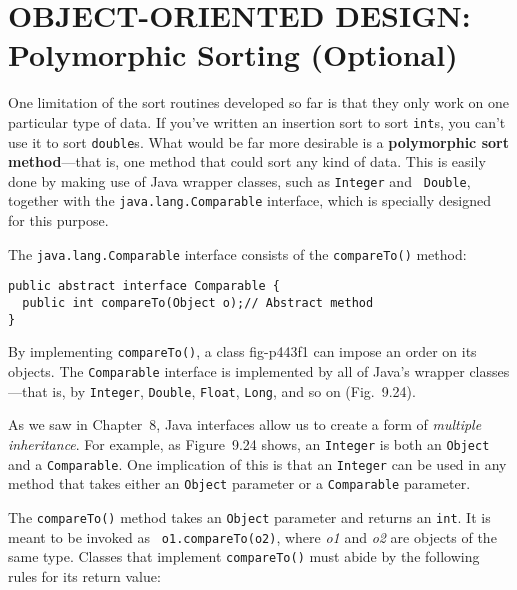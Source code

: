 
\section{OBJECT-ORIENTED DESIGN: \\[2pt]Polymorphic Sorting (Optional)}


\noindent One limitation of the sort routines developed so far is that they only
work on one particular type of data. If you've written an insertion
sort to sort {\tt int}s, you can't use it to sort {\tt double}s. What
would be far more desirable is a {\bf polymorphic sort method}---that
is, one method that could sort any kind of data. This is easily done
by making use of Java wrapper classes, such as {\tt Integer} and {\tt
Double}, together with the {\tt java.lang.Comparable} interface, which
is specially designed for this purpose.

The {\tt java.lang.Comparable} interface consists of the
\mbox{\tt compareTo()} method:

\begin{jjjlisting}
\begin{lstlisting}
public abstract interface Comparable {
  public int compareTo(Object o);// Abstract method
}
\end{lstlisting}
\end{jjjlisting}

\noindent By implementing {\tt compareTo()}, a class
{fig-p443f1}
can impose an order on its objects. The {\tt Comparable}
interface is implemented by all of Java's wrapper classes---that is,
by {\tt Integer}, {\tt Double}, {\tt Float}, {\tt Long}, and so on
(Fig.~9.24).

As we saw in Chapter~8, Java interfaces allow us to create a form of
{\em multiple inheritance}. For example, as Figure~9.24 shows, an
{\tt Integer} is both an \mbox{\tt Object} and a {\tt Comparable}. One
implication of this is that an {\tt Integer} can be used in any method
that takes either an {\tt Object} parameter or a {\tt Comparable}
parameter.

The {\tt compareTo()} method takes an {\tt Object} parameter and
returns an {\tt int}. It is meant to be invoked as {\tt
o1.compareTo(o2)}, where {\em o1} and {\em o2} are objects of the same
type. Classes that implement {\tt compareTo()} must abide by the
following rules for its return value:

